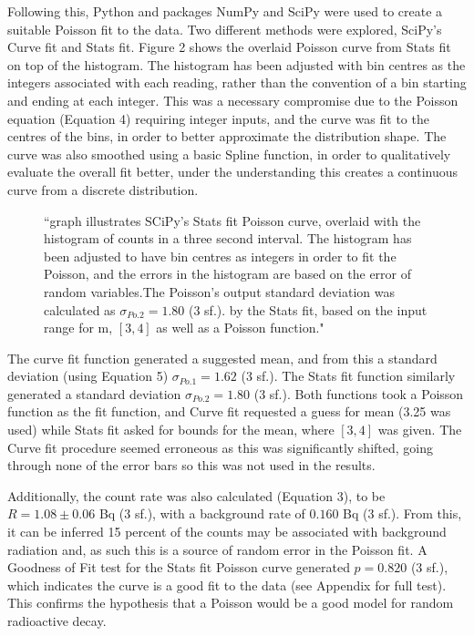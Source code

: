 \documentclass[11pt]{article}
\begin{document}
\noindent Following this, Python and packages NumPy and SciPy were used to create a suitable Poisson fit to the data. Two different methods were explored, SciPy's Curve fit and Stats fit. 
Figure 2 shows the overlaid Poisson curve from Stats fit on top of the histogram. The histogram has been adjusted with bin centres as the integers associated with each reading, rather than the convention of a bin starting and ending at each integer. This was a necessary compromise due to the Poisson equation (Equation 4) requiring integer inputs, and the curve was fit to the centres of the bins, in order to better approximate the distribution shape. The curve was also smoothed using a basic Spline function, in order to qualitatively evaluate the overall fit better, under the understanding this creates a continuous curve from a discrete distribution.
\begin{figure}[h]
        \begin{center}
            \def\svgwidth{\columnwidth}
            
             \caption{“graph illustrates SCiPy's Stats fit Poisson curve, overlaid with the histogram of counts in a three second interval. The histogram has been adjusted to have bin centres as integers in order to fit the Poisson, and the errors in the histogram are based on the error of random variables.The Poisson's output standard deviation was calculated as $\sigma_{Po.2} = 1.80$ (3 sf.). by the Stats fit,  based on the input range for m, $[3,4]$ as well as a Poisson function."}
             \label{fig:experimental results 1}
        \end{center}
    \end{figure}
\noindent The curve fit function generated a suggested mean, and from this a standard deviation (using Equation 5) $\sigma_{Po.1} = 1.62$ (3 sf.). The Stats fit function similarly generated a standard deviation $\sigma_{Po.2} = 1.80 $ (3 sf.). Both functions took a Poisson function as the fit function, and Curve fit requested a guess for mean (3.25 was used) while Stats fit asked for bounds for the mean, where $[3,4]$ was given. The Curve fit procedure seemed erroneous as this was significantly shifted, going through none of the error bars so this was not used in the results. 

\noindent Additionally, the count rate was also calculated (Equation 3), to be $R = 1.08 \pm 0.06$ Bq (3 sf.), with a background rate of $0.160$ Bq (3 sf.). From this, it can be inferred 15 percent of the counts may be associated with background radiation and, as such this is a source of random error in the Poisson fit.
A Goodness of Fit test for the Stats fit Poisson curve generated $p = 0.820$ (3 sf.), which indicates the curve is a good fit to the data (see Appendix for full test). This confirms the hypothesis that a Poisson would be a good model for random radioactive decay. 
\end{document}
